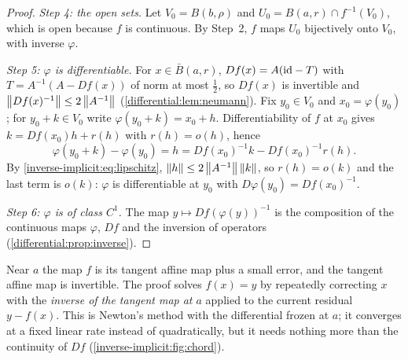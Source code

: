 \begin{notechapter}
\begin{proof}
\emph{Step 4: the open sets.} Let $V_0 = B(b, \rho)$ and
$U_0 = B(a, r)\cap f^{-1}(V_0)$, which is open because $f$ is continuous.
By Step~2, $f$ maps $U_0$ bijectively onto $V_0$, with inverse $\varphi$.

\emph{Step 5: $\varphi$ is differentiable.} For $x\in\bar B(a, r)$,
$Df(x) = A(\mathrm{id} - T)$ with $T = A^{-1}(A - Df(x))$ of norm at most
$\frac12$, so $Df(x)$ is invertible and
$\left\|Df(x)^{-1}\right\|\leq2\left\|A^{-1}\right\|$
(\cref{differential:lem:neumann}). Fix $y_0\in V_0$ and
$x_0 = \varphi(y_0)$; for $y_0 + k\in V_0$ write
$\varphi(y_0 + k) = x_0 + h$. Differentiability of $f$ at $x_0$ gives
$k = Df(x_0)h + r(h)$ with $r(h) = o(h)$, hence
\[
  \varphi(y_0 + k) - \varphi(y_0) = h
  = Df(x_0)^{-1}k - Df(x_0)^{-1}r(h) .
\]
By \eqref{inverse-implicit:eq:lipschitz},
$\left\|h\right\|\leq2\left\|A^{-1}\right\|\left\|k\right\|$, so $r(h) = o(k)$ and the last term is
$o(k)$: $\varphi$ is differentiable at $y_0$ with
$D\varphi(y_0) = Df(x_0)^{-1}$.

\emph{Step 6: $\varphi$ is of class $C^1$.} The map
$y\mapsto Df(\varphi(y))^{-1}$ is the composition of the continuous maps
$\varphi$, $Df$ and the inversion of operators
(\cref{differential:prop:inverse}).
\end{proof}

\begin{intuition}
Near $a$ the map $f$ is its tangent affine map plus a small error, and
the tangent affine map is invertible. The proof solves $f(x) = y$ by
repeatedly correcting $x$ with the \emph{inverse of the tangent map at
$a$} applied to the current residual $y - f(x)$. This is Newton's method
with the differential frozen at $a$; it converges at a fixed linear rate
instead of quadratically, but it needs nothing more than the continuity of
$Df$ (\cref{inverse-implicit:fig:chord}).
\end{intuition}


\end{notechapter}
